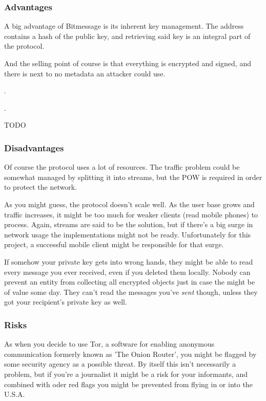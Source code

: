 \documentclass{bfh}
\begin{document}
  \subsubsection{Advantages}
  A big advantage of Bitmessage is its inherent key management. The address contains a hash of the public key, and retrieving said key is an integral part of the protocol.

  And the selling point of course is that everything is encrypted and signed, and there is next to no metadata an attacker could use.

  .

  .

  TODO

  \subsubsection{Disadvantages}
  Of course the protocol uses a lot of resources. The traffic problem could be somewhat managed by splitting it into streams\cite{wiki:stream}, but the \ac{POW} is required in order to protect the network.

  As you might guess, the protocol doesn't scale well. As the user base grows and traffic increases, it might be too much for weaker clients (read mobile phones) to process. Again, streams are said to be the solution, but if there's a big surge in network usage the implementations might not be ready. Unfortunately for this project, a successful mobile client might be responsible for that surge.

  If somehow your private key gets into wrong hands, they might be able to read every message you ever received, even if you deleted them locally. Nobody can prevent an entity from collecting all encrypted objects just in case the might be of value some day. They can't read the messages you've \textit{sent} though, unless they got your recipient's private key as well.

  \subsubsection{Risks}
  As when you decide to use Tor, a software for enabling anonymous communication formerly known as 'The Onion Router', you might be flagged by some security agency as a possible threat.\cite{wired:tor} By itself this isn't necessarily a problem, but if you're a journalist it might be a risk for your informants, and combined with oder red flags you might be prevented from flying in or into the U.S.A.
\end{document}
